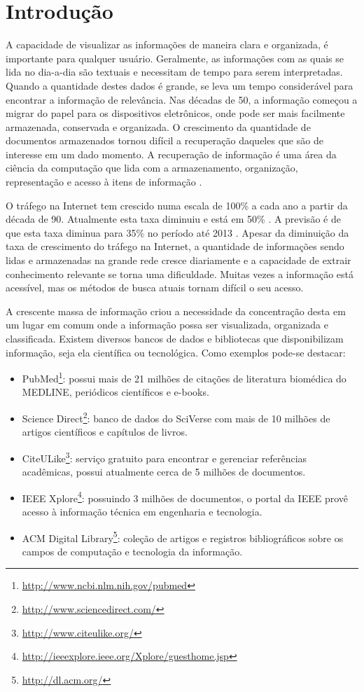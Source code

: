 \chapter{Introdução}
A capacidade de visualizar as informações de maneira clara e organizada, é importante para qualquer usuário. Geralmente, as informações com as quais se lida no dia-a-dia são textuais e necessitam de tempo para serem interpretadas. Quando a quantidade destes dados é grande, se leva um tempo considerável para encontrar a informação de relevância. Nas décadas de 50, a informação começou a migrar do papel para os dispositivos eletrônicos, onde pode ser mais facilmente armazenada, conservada e organizada. O crescimento da quantidade de documentos armazenados tornou difícil a recuperação daqueles que são de interesse em um dado momento. A recuperação de informação é uma área da ciência da computação que lida com a armazenamento, organização, representação e acesso à itens de informação \cite{Yates1999}.

O tráfego na Internet tem crescido numa escala de 100\% a cada ano a partir da década de 90. Atualmente esta taxa diminuiu e está em 50\% \cite{Odlyzko2003}. A previsão é de que esta taxa diminua para 35\% no período até 2013 \cite{Cisco2009}. Apesar da diminuição da taxa de crescimento do tráfego na Internet, a quantidade de informações sendo lidas e armazenadas na grande rede cresce diariamente e a capacidade de extrair conhecimento relevante se torna uma dificuldade. Muitas vezes a informação está acessível, mas os métodos de busca atuais tornam difícil o seu acesso.

A crescente massa de informação criou a necessidade da concentração desta em um lugar em comum onde a informação possa ser visualizada, organizada e classificada. Existem diversos bancos de dados e bibliotecas que disponibilizam informação, seja ela científica ou tecnológica. Como exemplos pode-se destacar:
\begin{itemize}
    \item PubMed\footnote{\href{http://www.ncbi.nlm.nih.gov/pubmed}{http://www.ncbi.nlm.nih.gov/pubmed}}:
    possui mais de 21 milhões de citações de literatura biomédica do MEDLINE, periódicos científicos e e-books.
    \item Science Direct\footnote{\href{http://www.sciencedirect.com/}{http://www.sciencedirect.com/}}:
    banco de dados do SciVerse com mais de 10 milhões de artigos científicos e capítulos de livros.
    \item CiteULike\footnote{\href{http://www.citeulike.org/}{http://www.citeulike.org/}}:
    serviço gratuito para encontrar e gerenciar referências acadêmicas, possui atualmente cerca de 5 milhões de documentos.
    \item IEEE Xplore\footnote{\href{http://ieeexplore.ieee.org/Xplore/guesthome.jsp}{http://ieeexplore.ieee.org/Xplore/guesthome.jsp}}:
    possuindo 3 milhões de documentos, o portal da IEEE provê acesso à informação técnica em engenharia e tecnologia.
    \item ACM Digital Library\footnote{\href{http://dl.acm.org/}{http://dl.acm.org/}}:
    coleção de artigos e registros bibliográficos sobre os campos de computação e tecnologia da informação.
\end{itemize}

